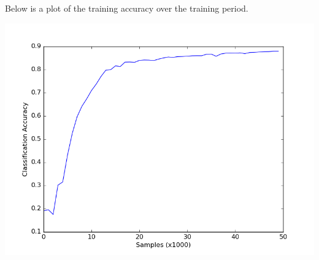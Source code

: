 \documentclass{article}
\begin{document}
\begin{enumerate}[a.]
\begin{itemize}
        Below is a plot of the training accuracy over the training period.
        \begin{center}
          \includegraphics[scale=0.5]{mse_acc}
        \end{center}
        
    \end{itemize}


\end{enumerate}
\end{document}
